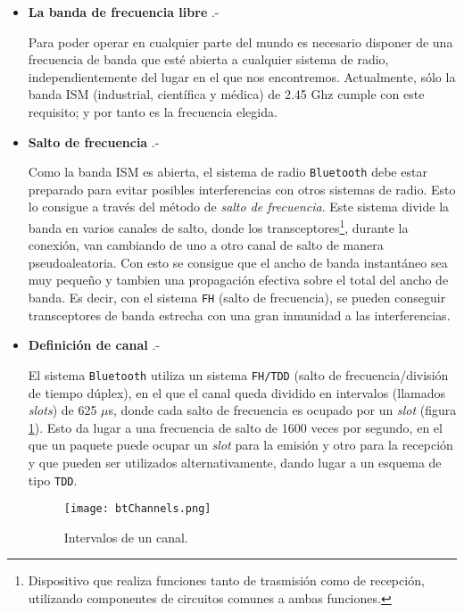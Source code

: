 \begin{itemize}
\item \textbf{La banda de frecuencia libre} .-

Para poder operar en cualquier parte del mundo es necesario disponer de una
frecuencia de banda que esté abierta a cualquier sistema de radio,
independientemente del lugar en el que nos encontremos. Actualmente, sólo la
banda \acs{ISM} (industrial, científica y médica) de 2.45 Ghz cumple con
este requisito; y por tanto es la frecuencia elegida.

\item \textbf{Salto de frecuencia} .-

Como la banda \acs{ISM} es abierta, el sistema de radio \texttt{Bluetooth} debe
estar preparado para evitar posibles interferencias con otros sistemas de
radio. Esto lo consigue a través del método de \emph{salto de frecuencia}.
Este sistema divide la banda en varios canales de salto, donde los
transceptores\footnote{Dispositivo que realiza funciones tanto de trasmisión
como de recepción, utilizando componentes de circuitos comunes a ambas
funciones.}, durante la conexión, van cambiando de uno a otro canal de
salto de manera pseudoaleatoria. Con esto se consigue que el ancho de banda
instantáneo sea muy pequeño y tambien una propagación efectiva sobre el
total del ancho de banda. Es decir, con el sistema \texttt{FH} (salto de
frecuencia), se pueden conseguir transceptores de banda estrecha con una
gran inmunidad a las interferencias.

\item \textbf{Definición de canal} .-

El sistema \texttt{Bluetooth} utiliza un sistema \texttt{FH/TDD} (salto de
frecuencia/división de tiempo dúplex), en el que el canal queda dividido en
intervalos (llamados \emph{slots}) de 625 $\mu$s, donde cada salto de
frecuencia es ocupado por un \emph{slot} (figura \ref{fig:btChannels}). Esto
da lugar a una frecuencia de salto de 1600 veces por segundo, en el que un
paquete puede ocupar un \emph{slot} para la emisión y otro para la recepción y
que pueden ser utilizados alternativamente, dando lugar a un esquema de tipo
\texttt{TDD}.

  \begin{figure}[H]
    \begin{center}
      \texttt{[image: btChannels.png]}
      \caption{Intervalos de un canal.}
      \label{fig:btChannels}
    \end{center}
  \end{figure}


\end{itemize}

